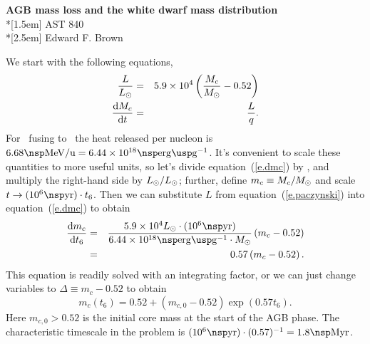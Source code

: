 \documentclass[11pt]{article}
\newcommand{\tsix}{\ensuremath{t_{6}}}
\begin{document}
\newcommand{\thetitle}{AGB mass loss and the white dwarf mass distribution}
\newcommand{\thecourse}{AST 840}
\newcommand{\theauthor}{Edward F. Brown}

\begin{titlepage}
\begin{center}
\LARGE{\textbf{\thetitle}}\\*[1.5em]
\Large{\thecourse}\\*[2.5em]
\large{\theauthor}
\end{center}
\end{titlepage}

We start with the following equations,
\begin{eqnarray}\label{e.paczynski}
\frac{L}{L_{\odot}} &=& 5.9\times 10^{4}\left(\frac{M_{c}}{M_\odot}-0.52\right)\\
\frac{\mathrm{d} M_{c}}{\mathrm{d} t} &=& \frac{L}{q}.\label{e.dmc}
\end{eqnarray}
For \hydrogen\ fusing to \helium\ the heat released per nucleon is $6.68\nsp\MeV/\amu = 6.44\ee{18}\nsp\ergs\usp\gram^{-1}$. It's convenient to scale these quantities to more useful units, so let's divide equation~(\ref{e.dmc}) by \Msun, and multiply the right-hand side by $L_{\odot}/L_{\odot}$; further, define $m_{c}\equiv M_{c}/M_\odot$ and scale $t\to (10^{6}\nsp\yr)\cdot\tsix$.  Then we can substitute $L$ from equation~(\ref{e.paczynski}) into equation~(\ref{e.dmc}) to obtain
\begin{eqnarray}
\frac{\dif m_{c}}{\dif\tsix} &=& \frac{5.9\ee{4}\Lsun\cdot (10^{6}\nsp\yr)}{6.44\ee{18}\nsp\ergs\usp\gram^{-1}\cdot\Msun} \left(m_{c}-0.52\right) \nonumber\\
 &=& 0.57\left(m_{c}-0.52\right).\label{e.de-mass}
\end{eqnarray}
This equation is readily solved with an integrating factor, or we can just change variables to $\Delta\equiv m_{c}-0.52$ to obtain
\begin{equation}
m_{c}(\tsix) = 0.52 + \left(m_{c,0}-0.52\right)\exp(0.57\tsix).
\end{equation}
Here $m_{c,0} > 0.52$ is the initial core mass at the start of the AGB phase. The characteristic timescale in the problem is $(10^{6}\nsp\yr )\cdot(0.57)^{-1} = 1.8\nsp\Mega\yr$.
\end{document}
